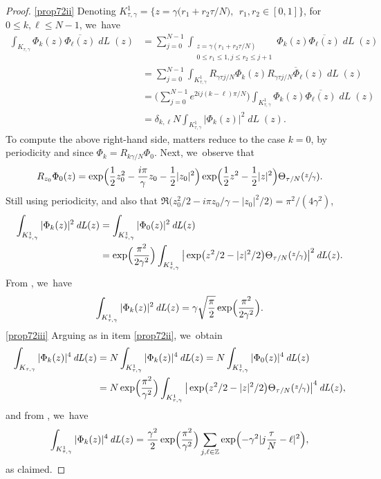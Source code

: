 \documentclass[10pt]{amsart}
\DeclareMathOperator{\dL}{\mathit{dL}}
\theoremstyle{definition}
\let\EE\exp
\let\ov\overline
\newcommand\Z{\mathbb Z}
\begin{document}
\begin{proof}
\eqref{prop72ii}
Denoting $K^1_{\tau,\gamma}=\bigl\{z=\gamma\bigl(r_{1}+r_{2}{\tau}/{N}\bigr),\;\, r_{1},r_{2}\in[0,1]\bigr\}$, for $0 \leq k, \ell \leq N-1$, we~have
\begin{align*}
\int_{K_{\tau,\gamma}}\Phi_{k}(z)\ov{\Phi_{\ell}(z)} \dL(z)&= \sum_{j=0}^{N-1}\int_{\substack{z=\gamma(r_{1}+r_{2}{\tau}/N)\\0\leq r_{1}\leq1,j\leq r_{2}\leq j+1}}\Phi_{k}(z)\ov{\Phi_{\ell}(z)} \dL(z) \\
& = \sum_{j=0}^{N-1}\int_{K^1_{\tau,\gamma}}R_{{\gamma \tau j}/{N}}\Phi_{k}(z)\ov{R_{{\gamma \tau j }/{N}}\Phi_{\ell}(z)} \dL(z) \\
&= \biggl(\sum_{j=0}^{N-1}e^{{2ij(k-\ell)\pi}/ N}\biggr)\int_{K^1_{\tau,\gamma}}\Phi_{k}(z)\ov{\Phi_{\ell}(z)}\dL(z)\\
& = \delta_{k,\ell}N\int_{K^1_{\tau,\gamma}}|\Phi_{k}(z)|^{2}\dL(z).
\end{align*}
To compute the above right-hand side, matters reduce to the case $k=0$, by periodicity and since $\Phi_{k}=R_{{k \gamma}/ N} \Phi_{0}$. Next, we~observe that
\[
R_{z_0} \Phi_0(z) = \EE \Bigl({\frac{1}{2} z_0^2- \frac{i\pi}{\gamma} z_0- \frac{1}{2} |z_0|^2} \Bigr)\EE\Bigl({\frac{1}{2} z^2 - \frac{1}{2} |z|^2}\Bigr) \Theta_{{\tau}/{N}}(\sfrac{z}{\gamma}).
\]
Still using periodicity, and also that $\Re \bigl(z_0^2/2 - {i\pi} z_0/ {\gamma} - |z_0|^2/2 \bigr) = {\pi^2}/({4 \gamma^2})$,
\begin{align*}
\int_{K^1_{\tau, \gamma}} |\Phi_{k}(z)|^2\dL(z) &= \int_{K^1_{\tau, \gamma}} |\Phi_{0}(z)|^2\dL(z) \\
& = \EE\Bigl(\frac{\pi^2}{2\gamma^2}\Bigr) \int_{K^1_{\tau, \gamma}} \big| \EE\bigl({ z^2/2 - |z|^2/2}\bigr) \Theta_{{\tau}/{N}}(\sfrac{z}{\gamma})\big|^2\dL(z).
\end{align*}
From \cite[last equality on p.\,681]{ABN}, we~have
\[
\int_{K^1_{\tau,\gamma}} |\Phi_{k}(z)|^2\dL(z) = \gamma \sqrt{\frac{\pi}{ {2}}} \EE\Bigl(\frac{\pi^2}{2\gamma^2}\Bigr).
\]
\eqref{prop72iii}
Arguing as in item \eqref{prop72ii}, we~obtain
\begin{align*}
\int_{K_{\tau, \gamma}} |\Phi_{k}(z)|^4\dL(z) &=N \int_{K^1_{\tau, \gamma}} |\Phi_{k}(z)|^4\dL(z) = N \int_{K^1_{\tau, \gamma}} |\Phi_{0}(z)|^4\dL(z) \\
& = N \EE\Bigl(\frac{\pi^2}{\gamma^2}\Bigr) \int_{K^1_{\tau,\gamma}} \big| \EE\bigl({ z^2/2 - |z|^2/2}\bigr) \Theta_{{\tau}/{N}}(\sfrac{z}{\gamma})\big|^4\dL(z),
\end{align*}
and from \cite[first equality on p.\,682]{ABN}, we~have
\[
\int_{K^1_{\tau,\gamma}} |\Phi_{k}(z)|^4\dL(z) = \frac{\gamma^2}2\EE\Bigl(\frac{\pi^2}{\gamma^2}\Bigr) \sum_{j, \ell\in \Z}\EE\Bigl({-\gamma^2 |j\frac{\tau}N-\ell|^{2}}\Bigr),
\]
as claimed.
\end{proof}
\end{document}
